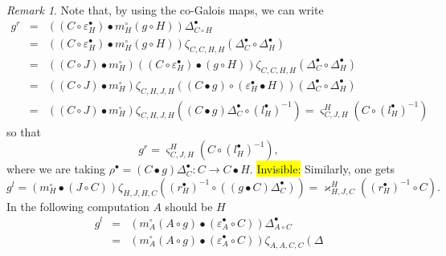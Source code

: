 \documentclass[nosumlimits,twoside]{amsart}
\theoremstyle{definition}
\theoremstyle{remark}
\newtheorem{remark}[remark]{\sc Remark}
\newenvironment{invisible}{{\noindent\sc \colorbox{yellow}{Invisible:}\;}\color{gray}}{\medskip}
\begin{document}
\begin{remark}
\label{rmk:Bohm}
    Note that, by using the co-Galois maps, we can write%
    \begin{eqnarray*}
g^{r} &=&\left( \left( C\circ \varepsilon _{H}^{\bullet }\right) \bullet
m_{H}^{\circ }\left( g\circ H\right) \right) \Delta _{C\circ H}^{\bullet } \\
&=&\left( \left( C\circ \varepsilon _{H}^{\bullet }\right) \bullet
m_{H}^{\circ }\left( g\circ H\right) \right) \zeta _{C,C,H,H}\left( \Delta
_{C}^{\bullet }\circ \Delta _{H}^{\bullet }\right) \nonumber \\
&=&\left( \left( C\circ J\right) \bullet m_{H}^{\circ }\right) \left( \left(
C\circ \varepsilon _{H}^{\bullet }\right) \bullet \left( g\circ H\right)
\right) \zeta _{C,C,H,H}\left( \Delta _{C}^{\bullet }\circ \Delta
_{H}^{\bullet }\right) \nonumber \\
&=&\left( \left( C\circ J\right) \bullet m_{H}^{\circ }\right) \zeta
_{C,H,J,H}\left( \left( C\bullet g\right) \circ \left( \varepsilon
_{H}^{\bullet }\bullet H\right) \right) \left( \Delta _{C}^{\bullet }\circ
\Delta _{H}^{\bullet }\right) \nonumber \\
&=&\left( \left( C\circ J\right) \bullet m_{H}^{\circ }\right) \zeta
_{C,H,J,H}\left( \left( C\bullet g\right) \Delta _{C}^{\bullet }\circ \left(
l_{H}^{\bullet }\right) ^{-1}\right) \nonumber=\varsigma^H _{C,J,H}(C\circ \left(
l_{H}^{\bullet }\right) ^{-1})
\end{eqnarray*}%
so that
\begin{equation}
 g^{r}=\varsigma^H _{C,J,H}(C\circ \left(
l_{H}^{\bullet }\right) ^{-1}),
\label{equivalentgr}
\end{equation}
where we are taking  $\rho^\bullet=\left( C\bullet g\right) \Delta^\bullet _{C}:C\to C\bullet H.$
\begin{invisible}
Similarly, one gets
\[g^{l}=\left( m_{H}^{\circ }\bullet \left( J\circ C\right) \right) \zeta
_{H,J,H,C}\left( \left( r_{H}^{\bullet }\right) ^{-1}\circ \left( \left(
g\bullet C\right) \Delta _{C}^{\bullet }\right) \right)=\varkappa _{H,J,C}^{H}(\left( r_{H}^{\bullet }\right) ^{-1}\circ C) .\]
In the following computation $A$ should be $H$
\begin{eqnarray*}
g^{l} &=&\left( m_{A}^{\circ }\left( A\circ g\right) \bullet \left(
\varepsilon _{A}^{\bullet }\circ C\right) \right) \Delta _{A\circ
C}^{\bullet } \\
&=&\left( m_{A}^{\circ }\left( A\circ g\right) \bullet \left( \varepsilon
_{A}^{\bullet }\circ C\right) \right) \zeta _{A,A,C,C}\left( \Delta

\end{eqnarray*}
\end{invisible}
\end{remark}
\end{document}
